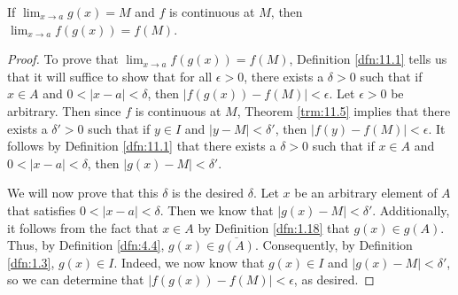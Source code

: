 \documentclass[../main.tex]{subfiles}
\begin{document}
\begin{theorem}\label{trm:11.13}
    If $\lim_{x\to a}g(x)=M$ and $f$ is continuous at $M$, then $\lim_{x\to a}f(g(x))=f(M)$.
    \begin{proof}
        To prove that $\lim_{x\to a}f(g(x))=f(M)$, Definition \ref{dfn:11.1} tells us that it will suffice to show that for all $\epsilon>0$, there exists a $\delta>0$ such that if $x\in A$ and $0<|x-a|<\delta$, then $|f(g(x))-f(M)|<\epsilon$. Let $\epsilon>0$ be arbitrary. Then since $f$ is continuous at $M$, Theorem \ref{trm:11.5} implies that there exists a $\delta'>0$ such that if $y\in I$ and $|y-M|<\delta'$, then $|f(y)-f(M)|<\epsilon$. It follows by Definition \ref{dfn:11.1} that there exists a $\delta>0$ such that if $x\in A$ and $0<|x-a|<\delta$, then $|g(x)-M|<\delta'$.\par
        We will now prove that this $\delta$ is the desired $\delta$. Let $x$ be an arbitrary element of $A$ that satisfies $0<|x-a|<\delta$. Then we know that $|g(x)-M|<\delta'$. Additionally, it follows from the fact that $x\in A$ by Definition \ref{dfn:1.18} that $g(x)\in g(A)$. Thus, by Definition \ref{dfn:4.4}, $g(x)\in\overline{g(A)}$. Consequently, by Definition \ref{dfn:1.3}, $g(x)\in I$. Indeed, we now know that $g(x)\in I$ and $|g(x)-M|<\delta'$, so we can determine that $|f(g(x))-f(M)|<\epsilon$, as desired.
    \end{proof}
\end{theorem}
\end{document}
